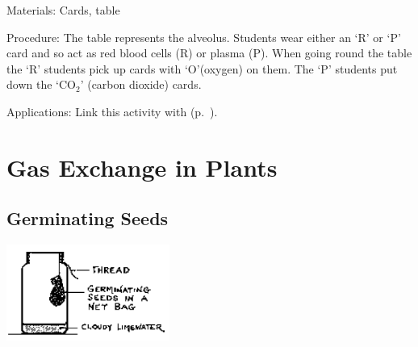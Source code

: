 \begin{multicols}{2}
\begin{description*}
\item[Materials:]{Cards, table}
\item[Procedure:]{The table represents the alveolus.
Students wear either an `R' or `P'
card and so act as red blood cells
(R) or plasma (P). When going
round the table the `R' students
pick up cards with `O'(oxygen)
on them. The `P' students put down the
`CO$_2$' (carbon dioxide) cards.}
\item[Applications:]{Link this activity with  (p.~\pageref{sub:circulation-game}).}
\end{description*}


\section*{Gas Exchange in Plants}


\subsection{Germinating Seeds} %

\begin{center}
\includegraphics[width=0.4\textwidth]{./img/source/germinating-seeds.png}
\end{center}


\end{multicols}
